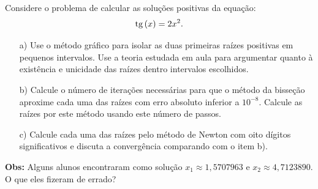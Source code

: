 \documentclass[main.tex]{subfiles}
\begin{document}
\begin{Exercise} Considere o problema de calcular as soluções positivas da equação:
  \begin{equation*}
    \operatorname{tg}\,(x)=2x^2.    
  \end{equation*}
\begin{itemize}
\item[a)] Use o método gráfico para isolar as duas primeiras raízes positivas em pequenos intervalos. Use a teoria estudada em aula para argumentar quanto à existência e unicidade das raízes dentro intervalos escolhidos.
\item[b)] Calcule o número de iterações necessárias para que o método da bisseção aproxime cada uma das raízes com erro absoluto inferior a $10^{-8}$. Calcule as raízes por este método usando este número de passos.
\item[c)]  Calcule cada uma das raízes pelo método de Newton com oito dígitos significativos e discuta a convergência comparando com o item b).
\end{itemize}
{\bf Obs:} Alguns alunos encontraram como solução $x_1\approx 1,5707963$ e $x_2 \approx 4,7123890$. O que eles fizeram de errado?
\end{Exercise}
\ifisscilab
\end{document}
